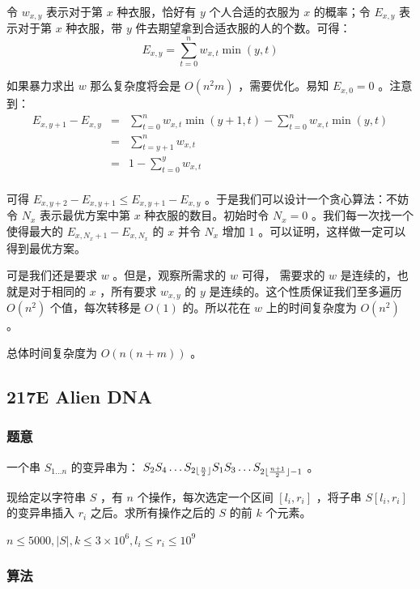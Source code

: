 \documentclass[11pt]{article}
\begin{document}
    令 $w_{x, y}$ 表示对于第 $x$ 种衣服，恰好有 $y$ 个人合适的衣服为 $x$ 的概率；令 $E_{x, y}$ 表示对于第 $x$ 种衣服，带 $y$ 件去期望拿到合适衣服的人的个数。可得：
    $$E_{x, y} = \sum_{t = 0}^{n} w_{x, t} \min (y, t)$$

    如果暴力求出 $w$ 那么复杂度将会是 $O(n^2m)$ ，需要优化。易知 $E_{x, 0} = 0$ 。注意到：
\[
\begin{array}{rcl}
E_{x, y + 1} - E_{x, y} & = & \sum_{t = 0}^n w_{x, t} \min (y + 1, t) - \sum_{t = 0}^n w_{x, t} \min (y, t) \\
 & = & \sum_{t = y + 1}^n w_{x, t} \\
 & = & 1 - \sum_{t = 0}^y w_{x, t} \\
\end{array}
\]

     可得 $E_{x, y + 2} - E_{x, y + 1} \leq E_{x, y + 1} - E_{x, y}$ 。于是我们可以设计一个贪心算法：不妨令 $N_x$ 表示最优方案中第 $x$ 种衣服的数目。初始时令 $N_x = 0$ 。我们每一次找一个使得最大的 $E_{x, N_x + 1} - E_{x, N_x}$ 的 $x$ 并令 $N_x$ 增加 1 。可以证明，这样做一定可以得到最优方案。

     可是我们还是要求 $w$ 。但是，观察所需求的 $w$ 可得， 需要求的 $w$ 是连续的，也就是对于相同的 $x$ ，所有要求 $w_{x, y}$ 的 $y$ 是连续的。这个性质保证我们至多遍历 $O(n^2)$ 个值，每次转移是 $O(1)$ 的。所以花在 $w$ 上的时间复杂度为 $O(n^2)$ 。

     总体时间复杂度为 $O(n(n+m))$ 。
\subsection{217E  Alien DNA}
\label{sec-9-7}
\subsubsection{题意}
\label{sec-9-7-1}

\begin{definition}
  一个串 $S_{1 \dots n}$ 的变异串为： $S_2 S_4 \dots S_{2 {\lfloor \frac{n}{2} \rfloor}} S_1 S_3 \dots S_{2 {\lfloor \frac{n + 1}{2} \rfloor} - 1}$ 。
\end{definition}

    现给定以字符串 $S$ ，有 $n$ 个操作，每次选定一个区间 $[l_i, r_i]$ ，将子串 $S[l_i, r_i]$ 的变异串插入 $r_i$ 之后。求所有操作之后的 $S$ 的前 $k$ 个元素。

    $n \leq 5000, |S|, k \leq 3 \times 10^6, l_i \leq r_i \leq 10^9$
\subsubsection{算法}
\label{sec-9-7-2}
\end{document}
